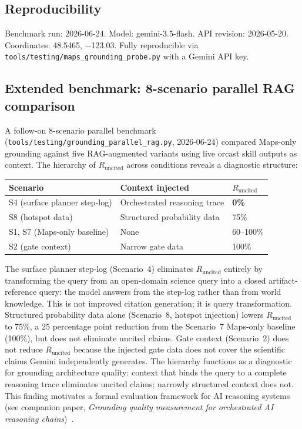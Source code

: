 \subsection{Reproducibility}

Benchmark run: 2026-06-24. Model: gemini-3.5-flash. API revision: 2026-05-20. Coordinates: 48.5465, $-$123.03. Fully reproducible via \texttt{tools/testing/maps\_grounding\_probe.py} with a Gemini API key.

\subsection{Extended benchmark: 8-scenario parallel RAG comparison}

A follow-on 8-scenario parallel benchmark (\texttt{tools/testing/grounding\_parallel\_rag.py}, 2026-06-24) compared Maps-only grounding against five RAG-augmented variants using live orcast skill outputs as context. The hierarchy of $R_\mathrm{uncited}$ across conditions reveals a diagnostic structure:

\begin{center}
\small
\begin{tabular}{@{}lll@{}}
  \toprule
  Scenario & Context injected & $R_\mathrm{uncited}$ \\
  \midrule
  S4 (surface planner step-log) & Orchestrated reasoning trace & \textbf{0\%} \\
  S8 (hotspot data) & Structured probability data & 75\% \\
  S1, S7 (Maps-only baseline) & None & 60--100\% \\
  S2 (gate context) & Narrow gate data & 100\% \\
  \bottomrule
\end{tabular}
\end{center}

The surface planner step-log (Scenario~4) eliminates $R_\mathrm{uncited}$ entirely by transforming the query from an open-domain science query into a closed artifact-reference query: the model answers from the step-log rather than from world knowledge. This is not improved citation generation; it is query transformation. Structured probability data alone (Scenario~8, hotspot injection) lowers $R_\mathrm{uncited}$ to 75\%, a 25 percentage point reduction from the Scenario~7 Maps-only baseline (100\%), but does not eliminate uncited claims. Gate context (Scenario~2) does not reduce $R_\mathrm{uncited}$ because the injected gate data does not cover the scientific claims Gemini independently generates. The hierarchy functions as a diagnostic for grounding architecture quality: context that binds the query to a complete reasoning trace eliminates uncited claims; narrowly structured context does not. This finding motivates a formal evaluation framework for AI reasoning systems (see companion paper, \textit{Grounding quality measurement for orchestrated AI reasoning chains})~\cite{arxiv231109533,arxiv240115884}.
